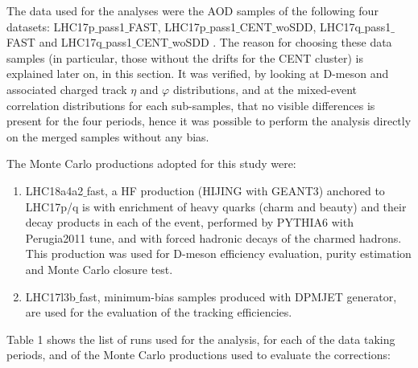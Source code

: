 The data used for the analyses were the AOD samples of the following four datasets:  	LHC17p$\_$pass1$\_$FAST, LHC17p$\_$pass1$\_$CENT$\_$woSDD, LHC17q$\_$pass1$\_$FAST and LHC17q$\_$pass1$\_$CENT$\_$woSDD . The reason for choosing these data samples (in particular, those without the drifts for the CENT cluster) is explained later on, in this section. It was verified, by looking at D-meson and associated charged track $\eta$ and $\varphi$ distributions, and at the mixed-event correlation distributions for each sub-samples, that no visible differences is present for the four periods, hence it was possible to perform the analysis directly on the merged samples without any bias.

The Monte Carlo productions adopted for this study were:
 \begin{enumerate}
 \item LHC18a4a2$\_$fast, a HF production (HIJING with GEANT3) anchored to LHC17p/q is with enrichment of heavy quarks (charm and beauty) and their decay products in each of the event, performed by PYTHIA6 with Perugia2011 tune, and with forced hadronic decays of the charmed hadrons. This production was used for D-meson efficiency evaluation, purity estimation and Monte Carlo closure test.
 \item LHC17l3b$\_$fast, minimum-bias samples produced with DPMJET generator, are used for the evaluation of the tracking efficiencies.
\end{enumerate}

Table 1 shows the list of runs used for the analysis, for each of the data taking periods, and of the Monte Carlo productions used to evaluate the corrections:

